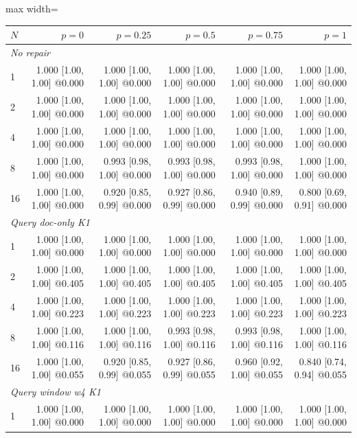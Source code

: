 \begin{table}[t]
\centering
\footnotesize
\setlength{\tabcolsep}{4pt}
\begin{adjustbox}{max width=\textwidth}
\begin{tabular}{lrrrrr}
\toprule
$N$ & $p=0$ & $p=0.25$ & $p=0.5$ & $p=0.75$ & $p=1$ \\
\midrule
\multicolumn{6}{l}{\emph{No repair}} \\
1 & 1.000 [1.00, 1.00] @0.000 & 1.000 [1.00, 1.00] @0.000 & 1.000 [1.00, 1.00] @0.000 & 1.000 [1.00, 1.00] @0.000 & 1.000 [1.00, 1.00] @0.000 \\
2 & 1.000 [1.00, 1.00] @0.000 & 1.000 [1.00, 1.00] @0.000 & 1.000 [1.00, 1.00] @0.000 & 1.000 [1.00, 1.00] @0.000 & 1.000 [1.00, 1.00] @0.000 \\
4 & 1.000 [1.00, 1.00] @0.000 & 1.000 [1.00, 1.00] @0.000 & 1.000 [1.00, 1.00] @0.000 & 1.000 [1.00, 1.00] @0.000 & 1.000 [1.00, 1.00] @0.000 \\
8 & 1.000 [1.00, 1.00] @0.000 & 0.993 [0.98, 1.00] @0.000 & 0.993 [0.98, 1.00] @0.000 & 0.993 [0.98, 1.00] @0.000 & 1.000 [1.00, 1.00] @0.000 \\
16 & 1.000 [1.00, 1.00] @0.000 & 0.920 [0.85, 0.99] @0.000 & 0.927 [0.86, 0.99] @0.000 & 0.940 [0.89, 0.99] @0.000 & 0.800 [0.69, 0.91] @0.000 \\
\midrule
\multicolumn{6}{l}{\emph{Query doc-only K1}} \\
1 & 1.000 [1.00, 1.00] @0.000 & 1.000 [1.00, 1.00] @0.000 & 1.000 [1.00, 1.00] @0.000 & 1.000 [1.00, 1.00] @0.000 & 1.000 [1.00, 1.00] @0.000 \\
2 & 1.000 [1.00, 1.00] @0.405 & 1.000 [1.00, 1.00] @0.405 & 1.000 [1.00, 1.00] @0.405 & 1.000 [1.00, 1.00] @0.405 & 1.000 [1.00, 1.00] @0.405 \\
4 & 1.000 [1.00, 1.00] @0.223 & 1.000 [1.00, 1.00] @0.223 & 1.000 [1.00, 1.00] @0.223 & 1.000 [1.00, 1.00] @0.223 & 1.000 [1.00, 1.00] @0.223 \\
8 & 1.000 [1.00, 1.00] @0.116 & 1.000 [1.00, 1.00] @0.116 & 0.993 [0.98, 1.00] @0.116 & 0.993 [0.98, 1.00] @0.116 & 1.000 [1.00, 1.00] @0.116 \\
16 & 1.000 [1.00, 1.00] @0.055 & 0.920 [0.85, 0.99] @0.055 & 0.927 [0.86, 0.99] @0.055 & 0.960 [0.92, 1.00] @0.055 & 0.840 [0.74, 0.94] @0.055 \\
\midrule
\multicolumn{6}{l}{\emph{Query window w4 K1}} \\
1 & 1.000 [1.00, 1.00] @0.000 & 1.000 [1.00, 1.00] @0.000 & 1.000 [1.00, 1.00] @0.000 & 1.000 [1.00, 1.00] @0.000 & 1.000 [1.00, 1.00] @0.000 \\

\end{tabular}
\end{adjustbox}
\end{table}
